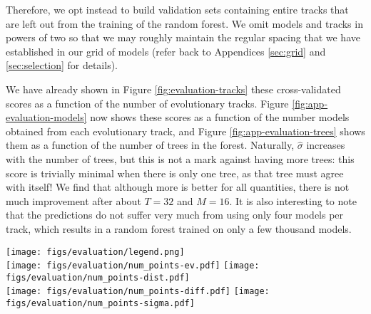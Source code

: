 \documentclass[twocolumn,twocolappendix]{aastex6}
\begin{document}
Therefore, we opt instead to build validation sets containing entire tracks that are left out from the training of the random forest. We omit models and tracks in powers of two so that we may roughly maintain the regular spacing that we have established in our grid of models (refer back to Appendices \ref{sec:grid} and \ref{sec:selection} for details). 

We have already shown in Figure \ref{fig:evaluation-tracks} these cross-validated scores as a function of the number of evolutionary tracks. Figure \ref{fig:app-evaluation-models} now shows these scores as a function of the number models obtained from each evolutionary track, and Figure \ref{fig:app-evaluation-trees} shows them as a function of the number of trees in the forest. Naturally, $\hat\sigma$ increases with the number of trees, but this is not a mark against having more trees: this score is trivially minimal when there is only one tree, as that tree must agree with itself! We find that although more is better for all quantities,  there is not much improvement after about $T=32$ and $M=16$. It is also interesting to note that the predictions do not suffer very much from using only four models per track, which results in a random forest trained on only a few thousand models. 

\begin{figure*}
    \centering
    \texttt{[image: figs/evaluation/legend.png]}\\
    \texttt{[image: figs/evaluation/num\_points-ev.pdf]}%
    \texttt{[image: figs/evaluation/num\_points-dist.pdf]}\\
    \texttt{[image: figs/evaluation/num\_points-diff.pdf]}%
    \texttt{[image: figs/evaluation/num\_points-sigma.pdf]}\\
    \caption{%
    Explained variance (top left), accuracy per precision distance (top right), normalized absolute error (bottom left), and normalized standard deviation of predictions (bottom right) for each stellar parameter as a function of the number of models per evolutionary track.} 
    \label{fig:app-evaluation-models}
\end{figure*}
\end{document}
